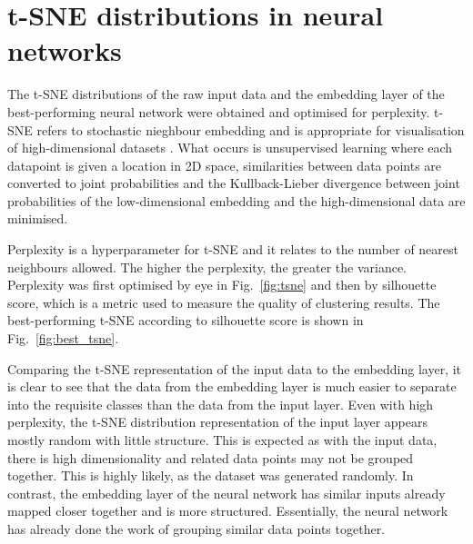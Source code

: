 \documentclass[11pt,a4paper]{article}
\begin{document}
\section{t-SNE distributions in neural networks}
The t-SNE distributions of the raw input data and the embedding layer of the best-performing neural network were obtained and optimised for perplexity. t-SNE refers to stochastic nieghbour embedding and is appropriate for visualisation of high-dimensional datasets \citep{JMLR:v9:vandermaaten08a}. What occurs is unsupervised learning where each datapoint is given a location in 2D space, similarities between data points are converted to joint probabilities and the Kullback-Lieber divergence between joint probabilities of the low-dimensional embedding and the high-dimensional data are minimised.

Perplexity is a hyperparameter for t-SNE and it relates to the number of nearest neighbours allowed. The higher the perplexity, the greater the variance. Perplexity was first optimised by eye in Fig.~\ref{fig:tsne} and then by silhouette score, which is a metric used to measure the quality of clustering results. The best-performing t-SNE according to silhouette score is shown in Fig.~\ref{fig:best_tsne}.

Comparing the t-SNE representation of the input data to the embedding layer, it is clear to see that the data from the embedding layer is much easier to separate into the requisite classes than the data from the input layer. Even with high perplexity, the t-SNE distribution representation of the input layer appears mostly random with little structure. This is expected as with the input data, there is high dimensionality and related data points may not be grouped together. This is highly likely, as the dataset was generated randomly. In contrast, the embedding layer of the neural network has similar inputs already mapped closer together and is more structured. Essentially, the neural network has already done the work of grouping similar data points together.
\end{document}
